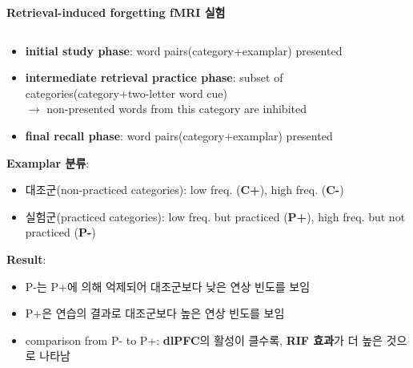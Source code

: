 \documentclass{beamer}
\begin{document}
\begin{frame}{\textbf{Retrieval-induced forgetting fMRI 실험}}
\begin{columns}
\begin{column}{0.6\textwidth}
      \begin{itemize}
        \setlength{\itemsep}{0em}
        \setlength{\parskip}{0em}
        \small
        \item \textbf{initial study phase}: word pairs(category+examplar) presented
        \item \textbf{intermediate retrieval practice phase}: subset of categories(category+two-letter word cue)\\
        $\longrightarrow$ non-presented words from this category are inhibited
        \item \textbf{final recall phase}: word pairs(category+examplar) presented
      \end{itemize}
      \vspace{0.5em}
      \textbf{Examplar 분류}:
      \vspace{-0.5em}
      \begin{itemize}
        \setlength{\itemsep}{0em}
        \setlength{\parskip}{0em}
        \small
        \item 대조군(non-practiced categories): low freq. (\textbf{C+}), high freq. (\textbf{C-})
        \item 실험군(practiced categories): low freq. but practiced (\textbf{P+}), high freq. but not practiced (\textbf{P-})
      \end{itemize}
      \vspace{0.5em}
      \textbf{Result}:
      \vspace{-0.5em}
      \begin{itemize}
        \setlength{\itemsep}{0em}
        \setlength{\parskip}{0em}
        \small
        \item P-는 P+에 의해 억제되어 대조군보다 낮은 연상 빈도를 보임
        \item P+은 연습의 결과로 대조군보다 높은 연상 빈도를 보임
        \item comparison from P- to P+: \textbf{dlPFC}의 활성이 클수록, \textbf{RIF 효과}가 더 높은 것으로 나타남
      \end{itemize}


    \end{column}
  \end{columns}
\end{frame}
\end{document}
